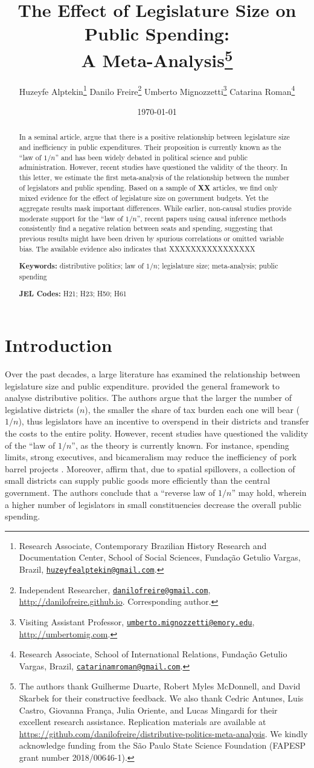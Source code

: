 \documentclass[a4paper,12pt]{article}
\title{The Effect of Legislature Size on Public Spending:\\ A Meta-Analysis\thanks{The authors thank Guilherme Duarte, Robert Myles McDonnell, and David Skarbek for their constructive feedback. We also thank Cedric Antunes, Luis Castro, Giovanna França, Julia Oriente, and Lucas Mingardi for their excellent research assistance. Replication materials are available at \url{https://github.com/danilofreire/distributive-politics-meta-analysis}. We kindly acknowledge funding from the São Paulo State Science Foundation (FAPESP grant number 2018/00646-1).}}
\author{Huzeyfe Alptekin\thanks{Research Associate, Contemporary Brazilian History Research and Documentation Center, School of Social Sciences, Fundação Getulio Vargas, Brazil, \href{mailto:huzeyfealptekin@gmail.com}{\texttt{huzeyfealptekin@gmail.com}}.}
\hspace{.5cm} Danilo Freire\thanks{Independent Researcher, \href{mailto:danilofreire@gmail.com}{\texttt{danilofreire@gmail.com}}, \url{http://danilofreire.github.io}. Corresponding author.} 
\hspace{.5cm} Umberto Mignozzetti\thanks{Visiting Assistant Professor, \href{mailto:umberto.mignozzetti@emory.edu}{\texttt{umberto.mignozzetti@emory.edu}}, \url{http://umbertomig.com}.} 
\hspace{.5cm} Catarina Roman\thanks{Research Associate, School of International Relations, Fundação Getulio Vargas, Brazil, \href{mailto:catarinamroman@gmail.com}{\texttt{catarinamroman@gmail.com}}.}}
\date{\today}
\begin{document}
\maketitle

\begin{abstract} 

\noindent In a seminal article, \citet{weingast1981political} argue that there
is a positive relationship between legislature size and inefficiency in public
expenditures. Their proposition is currently known as the ``law of $1/n$'' and
has been widely debated in political science and public administration.
However, recent studies have questioned the validity of the theory. In this
letter, we estimate the first meta-analysis of the relationship between the
number of legislators and public spending. Based on a sample of \textbf{XX}
articles, we find only mixed evidence for the effect of legislature size on
government budgets. Yet the aggregate results mask important differences. While
earlier, non-causal studies provide moderate support for the ``law of $1/n$'',
recent papers using causal inference methods consistently find a negative
relation between seats and spending, suggesting that previous results might
have been driven by spurious correlations or omitted variable bias. The
available evidence also indicates that XXXXXXXXXXXXXXXX

\vspace{.4cm}
\noindent \textbf{Keywords:} distributive politics; law of $1/n$; legislature
size; meta-analysis; public spending

\noindent \textbf{JEL Codes:} H21; H23; H50; H61
\end{abstract}

\newpage

\section{Introduction}
\label{sec:intro}

Over the past decades, a large literature has examined the relationship between
legislature size and public expenditure. \citet{weingast1981political} provided
the general framework to analyse distributive politics. The authors argue that
the larger the number of legislative districts ($n$), the smaller the share of
tax burden each one will bear ($1/n$), thus legislators have an incentive to
overspend in their districts and transfer the costs to the entire polity.
However, recent studies have questioned the validity of the ``law of $1/n$'', as
the theory is currently known. For instance, spending limits, strong executives,
and bicameralism may reduce the inefficiency of pork barrel projects
\citep{bradbury2009spatially,chen_malhotra_2007,primo2006stop}. Moreover,
\citet{primo2008distributive} affirm that, due to spatial spillovers, a
collection of small districts can supply public goods more efficiently than the
central government. The authors conclude that a ``reverse law of $1/n$'' may
hold, wherein a higher number of legislators in small constituencies decrease
the overall public spending.
\end{document}
